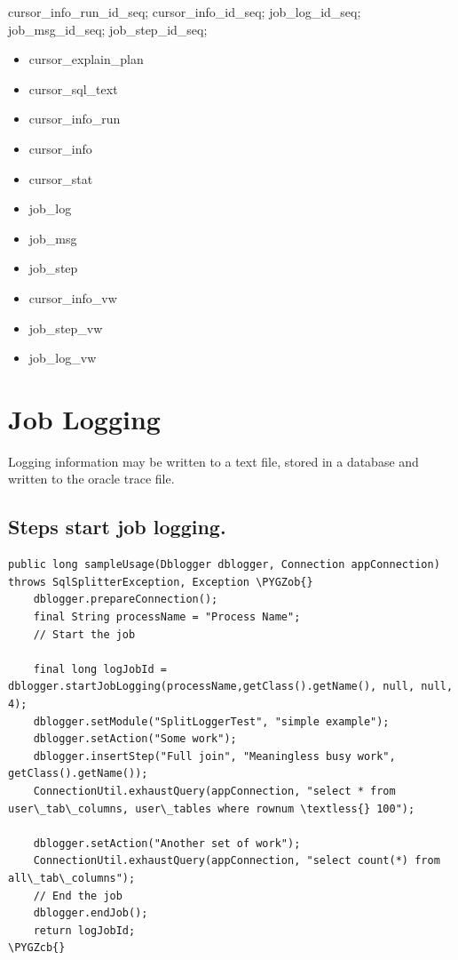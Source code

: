 \documentclass[letterpaper,10pt,english]{sphinxmanual}
\def\PYGZob{\char`\{}
\def\PYGZcb{\char`\}}
\begin{document}
cursor\_info\_run\_id\_seq; cursor\_info\_id\_seq; job\_log\_id\_seq;
job\_msg\_id\_seq; job\_step\_id\_seq;
\begin{itemize}
\item {} 
cursor\_explain\_plan

\item {} 
cursor\_sql\_text

\item {} 
cursor\_info\_run

\item {} 
cursor\_info

\item {} 
cursor\_stat

\item {} 
job\_log

\item {} 
job\_msg

\item {} 
job\_step

\end{itemize}
\begin{itemize}
\item {} 
cursor\_info\_vw

\item {} 
job\_step\_vw

\item {} 
job\_log\_vw

\end{itemize}


\section{Job Logging}
\label{index:job-logging}
Logging information may be written to a text file, stored in a database
and written to the oracle trace file.


\subsection{Steps start job logging.}
\label{index:steps-start-job-logging}
\begin{Verbatim}[commandchars=\\\{\}]
public long sampleUsage(Dblogger dblogger, Connection appConnection) throws SqlSplitterException, Exception \PYGZob{}
    dblogger.prepareConnection();
    final String processName = "Process Name";
    // Start the job

    final long logJobId = dblogger.startJobLogging(processName,getClass().getName(), null, null,  4);
    dblogger.setModule("SplitLoggerTest", "simple example");
    dblogger.setAction("Some work");
    dblogger.insertStep("Full join", "Meaningless busy work", getClass().getName());
    ConnectionUtil.exhaustQuery(appConnection, "select * from user\_tab\_columns, user\_tables where rownum \textless{} 100");

    dblogger.setAction("Another set of work");
    ConnectionUtil.exhaustQuery(appConnection, "select count(*) from all\_tab\_columns");
    // End the job
    dblogger.endJob();
    return logJobId;
\PYGZcb{}
\end{Verbatim}
\end{document}
